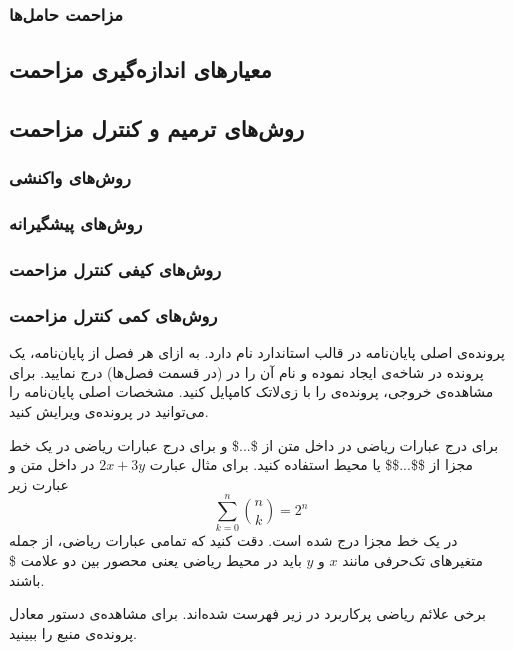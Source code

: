 \subsubsection{مزاحمت حامل‌ها}
\subsection{معیارهای اندازه‌گیری مزاحمت}
\subsection{روش‌های ترمیم و کنترل مزاحمت}
\subsubsection{روش‌های واکنشی}
\subsubsection{روش‌های پیشگیرانه}
\subsubsection{روش‌های کیفی کنترل مزاحمت}
\subsubsection{روش‌های کمی کنترل مزاحمت}


پرونده‌ی اصلی پایان‌نامه در قالب استاندارد
  نام دارد.
به ازای هر فصل از پایان‌نامه، یک پرونده در شاخه‌ی  ایجاد نموده
و نام آن را در   (در قسمت فصل‌ها) درج نمایید.
برای مشاهده‌ی خروجی، پرونده‌ی  را با زی‌لاتک کامپایل کنید.
مشخصات اصلی پایان‌نامه را می‌توانید در پرونده‌ی  ویرایش کنید.

برای درج عبارات ریاضی در داخل متن از \$...\$ و 
برای درج عبارات ریاضی در یک خط مجزا از \$\$...\$\$ یا محیط  
استفاده کنید. برای مثال عبارت 
$2x + 3y$
در داخل متن و عبارت زیر
\begin{equation}
\sum_{k=0}^{n} \binom{n}{k} = 2^n
\end{equation}
در یک خط مجزا درج شده است. 
دقت کنید که تمامی عبارات ریاضی، از جمله متغیرهای تک‌حرفی مانند $x$ و $y$ باید در محیط ریاضی 
یعنی محصور بین دو علامت \$ باشند. 

برخی علائم ریاضی پرکاربرد در زیر فهرست شده‌اند. 
برای مشاهده‌ی دستور  معادل پرونده‌ی منبع را ببینید.


